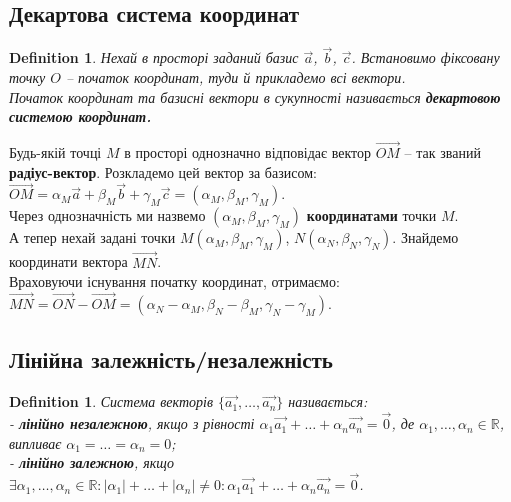 \documentclass[a4paper, 10pt]{extarticle}
\theoremstyle{theoremdd}
\theoremstyle{theoremdd}
\newtheorem{definition}[theorem]{Definition}
\theoremstyle{theoremdd}
\theoremstyle{theoremdd}
\theoremstyle{theoremdd}
\theoremstyle{theoremdd}
\theoremstyle{theoremdd}
\theoremstyle{theoremdd}
\begin{document}
\subsection{Декартова система координат}
\begin{definition}
Нехай в просторі заданий базис $\vec{a}$, $\vec{b}$, $\vec{c}$. Встановимо фіксовану точку $O$ -- початок координат, туди й прикладемо всі вектори.\\
Початок координат та базисні вектори в сукупності називається \textbf{декартовою системою координат.}
\begin{figure}[H]
\centering
\end{figure}
\end{definition}
Будь-якій точці $M$ в просторі однозначно відповідає вектор $\overrightarrow{OM}$ -- так званий \textbf{радіус-вектор}. Розкладемо цей вектор за базисом:\\
	$\overrightarrow{OM} = \alpha_M \vec{a} + \beta_M \vec{b} + \gamma_M \vec{c} = (\alpha_M, \beta_M, \gamma_M)$.\\
	Через однозначність ми назвемо $(\alpha_M, \beta_M, \gamma_M)$ \textbf{координатами} точки $M$.
	\bigskip \\
	А тепер нехай задані точки $M(\alpha_M, \beta_M, \gamma_M)$, $N(\alpha_N, \beta_N, \gamma_N)$. Знайдемо координати вектора $\overrightarrow{MN}$.\\
	Враховуючи існування початку координат, отримаємо:\\
	$\overrightarrow{MN} = \overrightarrow{ON} - \overrightarrow{OM} = (\alpha_N - \alpha_M, \beta_N - \beta_M, \gamma_N - \gamma_M)$.
	
	
\subsection{Лінійна залежність/незалежність}
\begin{definition}
Система векторів $\{\vec{a_1}, \dots, \vec{a_n}\}$ називається:\\
	- \textbf{лінійно незалежною}, якщо з рівності $\alpha_1 \vec{a_1} + \dots + \alpha_n \vec{a_n} = \vec{0}$, де $\alpha_1, \dots, \alpha_n \in \mathbb{R}$, випливає $\alpha_1 = \dots = \alpha_n = 0$;\\
	- \textbf{лінійно залежною}, якщо $\exists \alpha_1, \dots, \alpha_n \in \mathbb{R}: |\alpha_1| + \dots + |\alpha_n| \neq 0: \alpha_1 \vec{a_1} + \dots + \alpha_n \vec{a_n} = \vec{0}$.
\end{definition}
\end{document}
